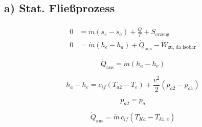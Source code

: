 \subsection*{a) Stat. Fließprozess}

\begin{align*}
0 &= \dot{m} (s_e - s_a) + \frac{\dot{Q}}{T} + \dot{S}_{\text{erzeug}} \\
0 &= \dot{m} (h_e - h_a) + \dot{Q}_{\text{aus}} - \dot{W}_{\text{zu, da isobar}}
\end{align*}

\[
\dot{Q}_{\text{aus}} = \dot{m} (h_a - h_e)
\]

\[
h_a - h_e = c_{if} (T_{a2} - T_{e}) + \frac{v^2}{2} (p_{a2} - p_{a1})
\]

\[
p_{a2} = p_a
\]

\[
\dot{Q}_{\text{aus}} = \dot{m} \, c_{if} (T_{Ka} - T_{k1,e})
\]